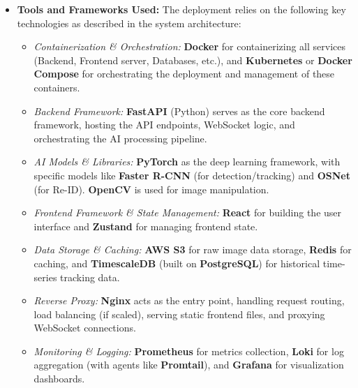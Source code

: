 \begin{itemize}
    \item \textbf{Tools and Frameworks Used:}
        The deployment relies on the following key technologies as described in the system architecture:
        \begin{itemize}
            \item \textit{Containerization \& Orchestration:} \textbf{Docker} for containerizing all services (Backend, Frontend server, Databases, etc.), and \textbf{Kubernetes} or \textbf{Docker Compose} for orchestrating the deployment and management of these containers.
            \item \textit{Backend Framework:} \textbf{FastAPI} (Python) serves as the core backend framework, hosting the API endpoints, WebSocket logic, and orchestrating the AI processing pipeline.
            \item \textit{AI Models \& Libraries:} \textbf{PyTorch} as the deep learning framework, with specific models like \textbf{Faster R-CNN} (for detection/tracking) and \textbf{OSNet} (for Re-ID). \textbf{OpenCV} is used for image manipulation.
            \item \textit{Frontend Framework \& State Management:} \textbf{React} for building the user interface and \textbf{Zustand} for managing frontend state.
            \item \textit{Data Storage \& Caching:} \textbf{AWS S3} for raw image data storage, \textbf{Redis} for caching, and \textbf{TimescaleDB} (built on \textbf{PostgreSQL}) for historical time-series tracking data.
            \item \textit{Reverse Proxy:} \textbf{Nginx} acts as the entry point, handling request routing, load balancing (if scaled), serving static frontend files, and proxying WebSocket connections.
            \item \textit{Monitoring \& Logging:} \textbf{Prometheus} for metrics collection, \textbf{Loki} for log aggregation (with agents like \textbf{Promtail}), and \textbf{Grafana} for visualization dashboards.
        \end{itemize}


\end{itemize}
